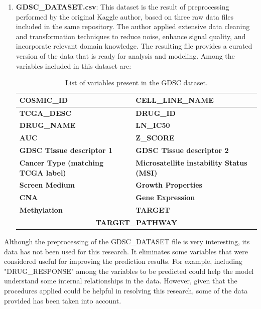 \begin{enumerate}
    \item \textbf{GDSC\_DATASET.csv}: This dataset is the result of preprocessing performed by the original Kaggle author, based on three raw data files included in the same repository. The author applied extensive data cleaning and transformation techniques to reduce noise, enhance signal quality, and incorporate relevant domain knowledge. The resulting file provides a curated version of the data that is ready for analysis and modeling. Among the variables included in this dataset are:
    \begin{table}[H]
        \centering
        \begin{tabular}{|l|l|}
        \hline
        \textbf{COSMIC\_ID} & \textbf{CELL\_LINE\_NAME} \\ \hline
        \textbf{TCGA\_DESC} & \textbf{DRUG\_ID} \\ \hline
        \textbf{DRUG\_NAME} & \textbf{LN\_IC50} \\ \hline
        \textbf{AUC} & \textbf{Z\_SCORE} \\ \hline
        \textbf{GDSC Tissue descriptor 1} & \textbf{GDSC Tissue descriptor 2} \\ \hline
        \textbf{Cancer Type (matching TCGA label)} & \textbf{Microsatellite instability Status (MSI)} \\ \hline
        \textbf{Screen Medium} & \textbf{Growth Properties} \\ \hline
        \textbf{CNA} & \textbf{Gene Expression} \\ \hline
        \textbf{Methylation} & \textbf{TARGET} \\ \hline
        \multicolumn{2}{|c|}{\textbf{TARGET\_PATHWAY}} \\ \hline
        \end{tabular}
        \caption{List of variables present in the GDSC dataset.}
        \label{tab:gdsc_vars}
        \end{table}
\end{enumerate}

Although the preprocessing of the GDSC\_DATASET file is very interesting, its data has not been used for this research. It eliminates some variables that were considered useful for improving the prediction results. For example, including "DRUG\_RESPONSE" among the variables to be predicted could help the model understand some internal relationships in the data. However, given that the procedures applied could be helpful in resolving this research, some of the data provided has been taken into account.


